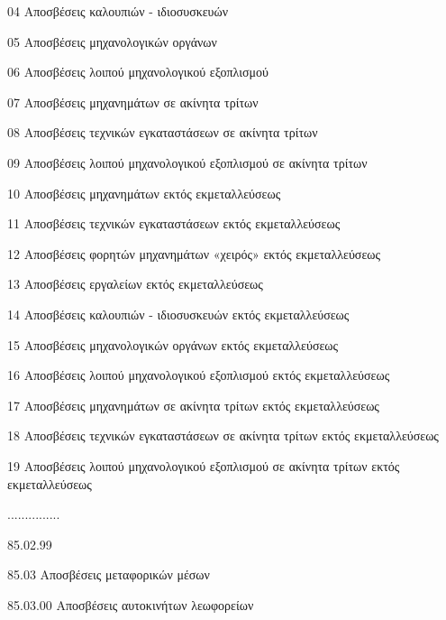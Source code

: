 \documentclass[A4,10pt,greek]{book}
\begin{document}
                               04    Αποσβέσεις καλουπιών - ιδιοσυσκευών

                               05    Αποσβέσεις μηχανολογικών οργάνων

                               06    Αποσβέσεις λοιπού μηχανολογικού εξοπλισμού

                               07    Αποσβέσεις μηχανημάτων σε ακίνητα τρίτων

                               08    Αποσβέσεις τεχνικών εγκαταστάσεων σε ακίνητα τρίτων

                               09    Αποσβέσεις λοιπού μηχανολογικού εξοπλισμού σε ακίνητα
                                       τρίτων

                               10    Αποσβέσεις μηχανημάτων εκτός εκμεταλλεύσεως

                               11    Αποσβέσεις τεχνικών εγκαταστάσεων εκτός εκμεταλλεύσεως

                               12    Αποσβέσεις φορητών μηχανημάτων «χειρός» εκτός
                                       εκμεταλλεύσεως

                               13    Αποσβέσεις εργαλείων εκτός εκμεταλλεύσεως

                               14    Αποσβέσεις καλουπιών - ιδιοσυσκευών εκτός εκμεταλλεύσεως

                               15    Αποσβέσεις μηχανολογικών οργάνων εκτός εκμεταλλεύσεως

                               16    Αποσβέσεις λοιπού μηχανολογικού εξοπλισμού εκτός
                                       εκμεταλλεύσεως

                               17    Αποσβέσεις μηχανημάτων σε ακίνητα τρίτων εκτός
                                       εκμεταλλεύσεως

                               18    Αποσβέσεις τεχνικών εγκαταστάσεων σε ακίνητα τρίτων εκτός
                                       εκμεταλλεύσεως

                               19    Αποσβέσεις λοιπού μηχανολογικού εξοπλισμού σε ακίνητα
                                       τρίτων εκτός εκμεταλλεύσεως

                    ...............

                    85.02.99

        85.03    Αποσβέσεις μεταφορικών μέσων

                    85.03.00    Αποσβέσεις αυτοκινήτων λεωφορείων
\end{document}
